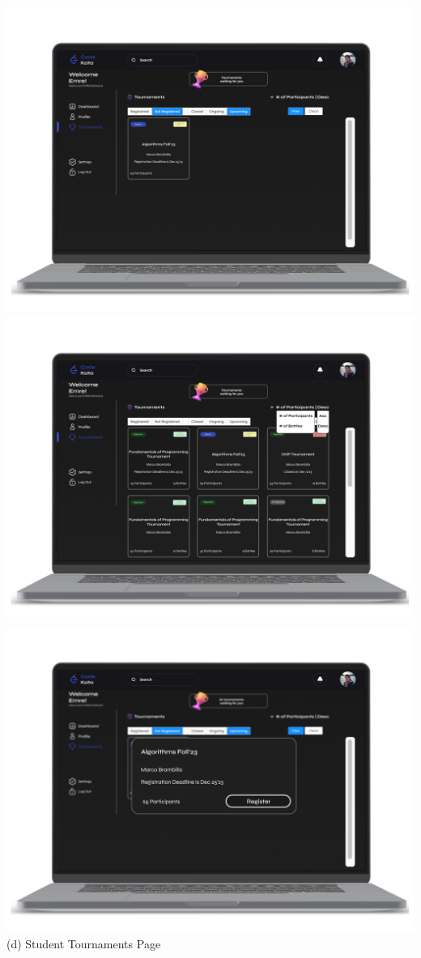 \begin{center}
    \includegraphics[scale=0.13]{Images/ui-ux/student_tournaments/student_tournaments_2.png}    \includegraphics[scale=0.13]{Images/ui-ux/student_tournaments/student_tournaments_3.png}    \includegraphics[scale=0.13]{Images/ui-ux/student_tournaments/student_tournaments_4.png}
        (d) Student Tournaments Page
\end{center}

